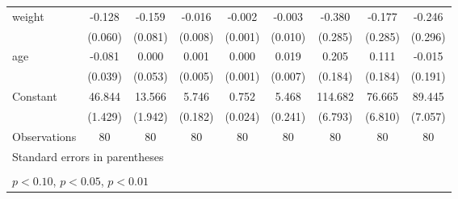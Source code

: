 \begin{table}[htbp]
\begin{tabular}{l*{8}{c}}
\addlinespace
weight              &      -0.128\sym{**} &      -0.159\sym{*}  &      -0.016\sym{**} &      -0.002\sym{**} &      -0.003         &      -0.380         &      -0.177         &      -0.246         \\
                    &     (0.060)         &     (0.081)         &     (0.008)         &     (0.001)         &     (0.010)         &     (0.285)         &     (0.285)         &     (0.296)         \\
\addlinespace
age                 &      -0.081\sym{**} &       0.000         &       0.001         &       0.000         &       0.019\sym{***}&       0.205         &       0.111         &      -0.015         \\
                    &     (0.039)         &     (0.053)         &     (0.005)         &     (0.001)         &     (0.007)         &     (0.184)         &     (0.184)         &     (0.191)         \\
\addlinespace
Constant            &      46.844\sym{***}&      13.566\sym{***}&       5.746\sym{***}&       0.752\sym{***}&       5.468\sym{***}&     114.682\sym{***}&      76.665\sym{***}&      89.445\sym{***}\\
                    &     (1.429)         &     (1.942)         &     (0.182)         &     (0.024)         &     (0.241)         &     (6.793)         &     (6.810)         &     (7.057)         \\
\midrule
Observations        &          80         &          80         &          80         &          80         &          80         &          80         &          80         &          80         \\
\bottomrule
\multicolumn{9}{l}{\footnotesize Standard errors in parentheses}\\
\multicolumn{9}{l}{\footnotesize  }\\
\multicolumn{9}{l}{\footnotesize \sym{*} \(p<0.10\), \sym{**} \(p<0.05\), \sym{***} \(p<0.01\)}\\
\end{tabular}
\end{table}
